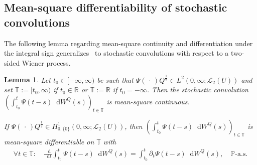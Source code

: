 \documentclass[reqno]{amsart}
\numberwithin{equation}{section}
\newcommand{\bbP}{\mathbb{P}}
\newcommand{\bbR}{\mathbb{R}}
\newcommand{\bbT}{\mathbb{T}}
\newcommand{\R}{\mathbb{R}}
\newcommand{\rd}{\mathop{}\!\mathrm{d}}
\newtheorem{lemma}{Lemma}[section]
\theoremstyle{remark}
\theoremstyle{definition}
\begin{document}
\subsection{Mean-square differentiability of stochastic convolutions}

The following lemma regarding 
mean-square continuity and differentiation under
the integral sign generalizes~\cite[Propositions~3.18 and~3.21]{KW2022} to stochastic convolutions
with respect to a two-sided Wiener process.

\begin{lemma}\label{lem:stoch-conv-Psi-diffb-under-int}
	Let $t_0 \in [-\infty, \infty)$ be such that
	$\Psi(\,\cdot\,)Q^\frac{1}{2}\in L^2(0, \infty; \mathscr L_2(U))$ and
	set $\bbT := [t_0, \infty)$ if $t_0 \in \bbR$ or $\bbT := \R$ if $t_0 = -\infty$.
	Then the stochastic convolution
	$(\int_{t_0}^t \Psi(t-s)\rd W^Q(s))_{t\in \bbT}$ is mean-square continuous.
	
	If $\Psi(\,\cdot\,)Q^\frac{1}{2}\in H^1_{0,\{0\}}(0, \infty; \mathscr L_2(U))$,
	then  
	$(\int_{t_0}^t \Psi(t-s)\rd W^Q(s))_{t\in \bbT}$ is mean-square differentiable on $\bbT$
	with 
	\begin{align}
		\forall
		t \in \bbT : \quad
		\frac{\rd}{\rd t}\int_{t_0}^{t} \Psi(t-s)\rd W^Q(s) 
		= 
		\int_{t_0}^t \partial_t \Psi(t-s) \rd W^Q(s),
		\quad 
		\bbP\text{-a.s.}
		\label{eq:stoch-conv-Psi-diffb-under-int-sign}
	\end{align}
\end{lemma}
%
\end{document}
